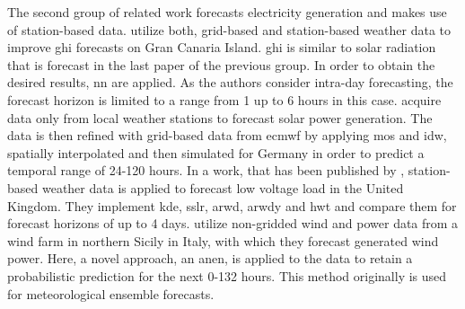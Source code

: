 The second group of related work forecasts electricity generation and makes use of station-based data. \Eg {} utilize both, grid-based and station-based weather data to improve \gls{ghi} forecasts on Gran Canaria Island. \gls{ghi} is similar to solar radiation that is forecast in the last paper of the previous group. In order to obtain the desired results, \gls{nn} are applied. As the authors consider intra-day forecasting, the forecast horizon is limited to a range from 1 up to 6 hours in this case.  acquire data only from local weather stations to forecast solar power generation. The data is then refined with grid-based data from \gls{ecmwf} by applying \gls{mos} and \gls{idw}, spatially interpolated and then simulated for Germany in order to predict a temporal range of 24-120 hours. In a work, that has been published by , station-based weather data is applied to forecast low voltage load in the United Kingdom. They implement \gls{kde}, \gls{sslr}, \gls{arwd}, \gls{arwdy} and \gls{hwt} and compare them for forecast horizons of up to 4 days.  utilize non-gridded wind and power data from a wind farm in northern Sicily in Italy, with which they forecast generated wind power. Here, a novel approach, an \gls{anen}, is applied to the data to retain a probabilistic prediction for the next 0-132 hours. This method originally is used for meteorological ensemble forecasts.\\

